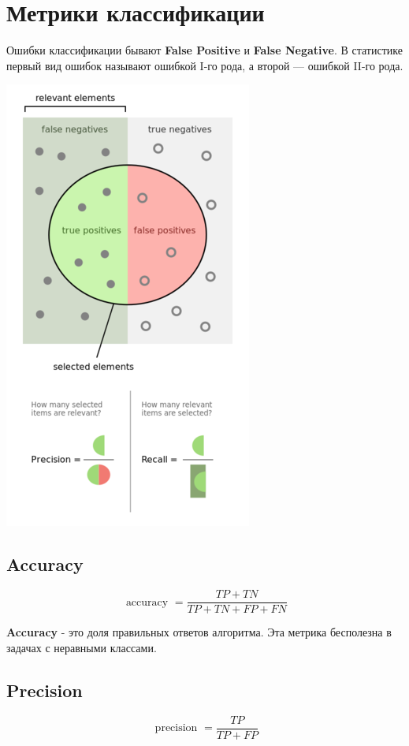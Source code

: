 \section{Метрики классификации} 

Ошибки классификации бывают \textbf{False Positive} и \textbf{False Negative}. В статистике первый вид ошибок называют ошибкой I-го рода, а второй — ошибкой II-го рода.

\begin{center}
    \includegraphics[scale=0.8]{tickets/pictures/diag.png}
\end{center}

\subsection{Accuracy}
$$
\text { accuracy }=\frac{T P+T N}{T P+T N+F P+F N}
$$

\textbf{Accuracy} - это доля правильных ответов алгоритма. Эта метрика бесполезна в задачах с неравными классами.

\subsection{Precision}
$$
\text { precision }=\frac{T P}{T P+F P}
$$

